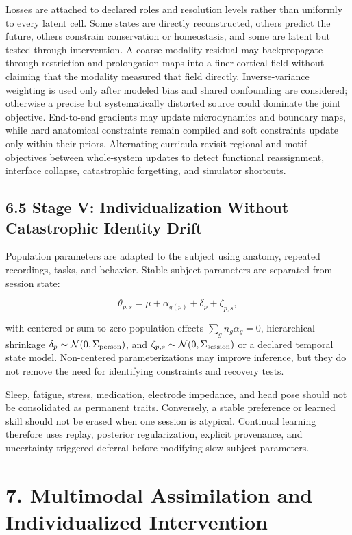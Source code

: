 Losses are attached to declared roles and resolution levels rather than
uniformly to every latent cell. Some states are directly reconstructed, others
predict the future, others constrain conservation or homeostasis, and some are
latent but tested through intervention. A coarse-modality residual may
backpropagate through restriction and prolongation maps into a finer cortical
field without claiming that the modality measured that field directly.
Inverse-variance weighting is used only after modeled bias and shared
confounding are considered; otherwise a precise but systematically distorted
source could dominate the joint objective.
End-to-end gradients may update microdynamics and boundary maps, while hard
anatomical constraints remain compiled and soft constraints update only within
their priors. Alternating curricula revisit regional and motif objectives
between whole-system updates to detect functional reassignment, interface
collapse, catastrophic forgetting, and simulator shortcuts.

\subsection{6.5 Stage V: Individualization Without Catastrophic Identity Drift}

Population parameters are adapted to the subject using anatomy, repeated
recordings, tasks, and behavior. Stable subject parameters are separated from
session state:

\[
\theta_{p,s}=\mu+
\alpha_{g(p)}+
\delta_{p}+
\zeta_{p,s},
\]

with centered or sum-to-zero population effects
\(\sum_g n_g\alpha_g=0\), hierarchical shrinkage
\(\delta_p\sim\mathcal N(0,\Sigma_{\rm person})\), and
\(\zeta_{p,s}\sim\mathcal N(0,\Sigma_{\rm session})\) or a declared temporal
state model. Non-centered parameterizations may improve inference, but they do
not remove the need for identifying constraints and recovery tests.

Sleep, fatigue, stress, medication, electrode impedance, and head pose should
not be consolidated as permanent traits. Conversely, a stable preference or
learned skill should not be erased when one session is atypical. Continual
learning therefore uses replay, posterior regularization, explicit provenance,
and uncertainty-triggered deferral before modifying slow subject parameters.

\section{7. Multimodal Assimilation and Individualized Intervention}

